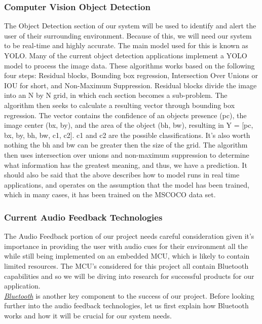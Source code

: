 \subsubsection{Computer Vision Object Detection}
\label{CV_Obj_Det}
\noindent The Object Detection section of our system will be used to identify and alert the user of their surrounding environment. Because of this, we will need our system to be real-time and highly accurate. The main model used for this is known as YOLO. Many of the current object detection applications implement a YOLO model to process the image data. These algorithms works based on the following four steps: Residual blocks, Bounding box regression, Intersection Over Unions or IOU for short, and Non-Maximum Suppression. Residual blocks divide the image into an N by N grid, in which each section becomes a sub-problem. The algorithm then seeks to calculate a resulting vector through bounding box regression. The vector contains the confidence of an objects presence (pc), the image center (bx, by), and the area of the object (bh, bw), resulting in Y = [pc, bx, by, bh, bw, c1, c2]. c1 and c2 are the possible classifications. It's also worth nothing the bh and bw can be greater then the size of the grid. The algorithm then uses intersection over unions and non-maximum suppression to determine what information has the greatest meaning, and thus, we have a prediction. It should also be said that the above describes how to model runs in real time applications, and operates on the assumption that the model has been trained, which in many cases, it has been trained on the MSCOCO data set. \\

\subsubsection{Current Audio Feedback Technologies}
\noindent The Audio Feedback portion of our project needs careful consideration given it's importance in providing the user with audio cues for their environment all the while still being implemented on an embedded MCU, which is likely to contain limited resources. The MCU's considered for this project all contain Bluetooth capabilities and so we will be diving into research for successful products for our application. \\

\noindent \underline{\textit{Bluetooth}} \cite{bluetooth} is another key component to the success of our project. Before looking further into the audio feedback technologies, let us first explain how Bluetooth works and how it will be crucial for our system needs. \\

